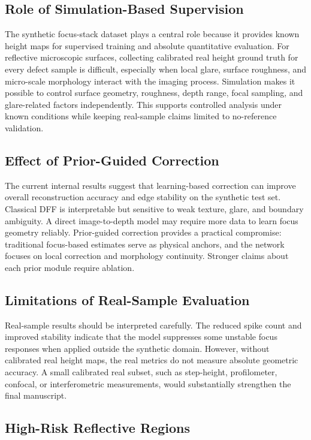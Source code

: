 \documentclass[11pt,a4paper]{article}
\begin{document}
\subsection{Role of Simulation-Based Supervision}

The synthetic focus-stack dataset plays a central role because it provides known height maps for supervised training and absolute quantitative evaluation. For reflective microscopic surfaces, collecting calibrated real height ground truth for every defect sample is difficult, especially when local glare, surface roughness, and micro-scale morphology interact with the imaging process. Simulation makes it possible to control surface geometry, roughness, depth range, focal sampling, and glare-related factors independently. This supports controlled analysis under known conditions while keeping real-sample claims limited to no-reference validation.

\subsection{Effect of Prior-Guided Correction}

The current internal results suggest that learning-based correction can improve overall reconstruction accuracy and edge stability on the synthetic test set. Classical DFF is interpretable but sensitive to weak texture, glare, and boundary ambiguity. A direct image-to-depth model may require more data to learn focus geometry reliably. Prior-guided correction provides a practical compromise: traditional focus-based estimates serve as physical anchors, and the network focuses on local correction and morphology continuity. Stronger claims about each prior module require ablation.

\subsection{Limitations of Real-Sample Evaluation}

Real-sample results should be interpreted carefully. The reduced spike count and improved stability indicate that the model suppresses some unstable focus responses when applied outside the synthetic domain. However, without calibrated real height maps, the real metrics do not measure absolute geometric accuracy. A small calibrated real subset, such as step-height, profilometer, confocal, or interferometric measurements, would substantially strengthen the final manuscript.

\subsection{High-Risk Reflective Regions}
\end{document}
